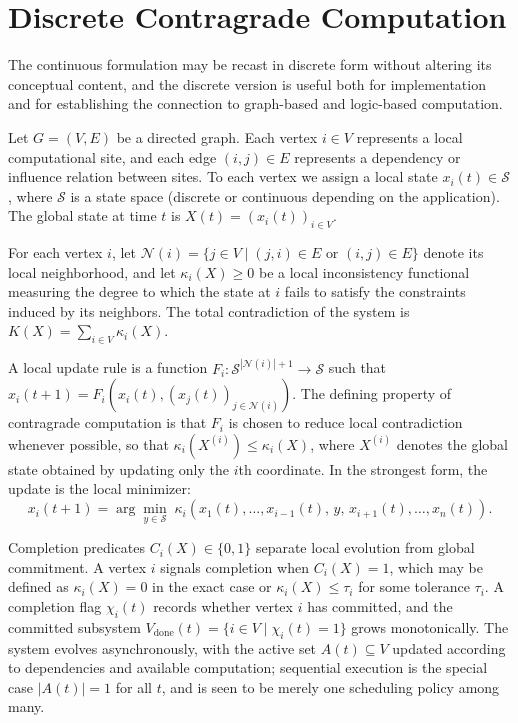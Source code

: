 \documentclass[12pt,a4paper,openany]{book}
\theoremstyle{plain}
\theoremstyle{definition}
\theoremstyle{remark}
\begin{document}
\section{Discrete Contragrade Computation}

The continuous formulation may be recast in discrete form without altering its conceptual content, and the discrete version is useful both for implementation and for establishing the connection to graph-based and logic-based computation.

Let $G = (V, E)$ be a directed graph. Each vertex $i \in V$ represents a local computational site, and each edge $(i, j) \in E$ represents a dependency or influence relation between sites. To each vertex we assign a local state $x_i(t) \in \mathcal{S}$, where $\mathcal{S}$ is a state space (discrete or continuous depending on the application). The global state at time $t$ is $X(t) = (x_i(t))_{i \in V}$.

For each vertex $i$, let $\mathcal{N}(i) = \{j \in V \mid (j, i) \in E \text{ or } (i, j) \in E\}$ denote its local neighborhood, and let $\kappa_i(X) \geq 0$ be a local inconsistency functional measuring the degree to which the state at $i$ fails to satisfy the constraints induced by its neighbors. The total contradiction of the system is $K(X) = \sum_{i \in V} \kappa_i(X)$.

A local update rule is a function $F_i : \mathcal{S}^{|\mathcal{N}(i)|+1} \to \mathcal{S}$ such that $x_i(t+1) = F_i(x_i(t), (x_j(t))_{j \in \mathcal{N}(i)})$. The defining property of contragrade computation is that $F_i$ is chosen to reduce local contradiction whenever possible, so that $\kappa_i(X^{(i)}) \leq \kappa_i(X)$, where $X^{(i)}$ denotes the global state obtained by updating only the $i$th coordinate. In the strongest form, the update is the local minimizer:
\[
x_i(t+1) = \arg\min_{y \in \mathcal{S}}\; \kappa_i(x_1(t), \ldots, x_{i-1}(t),\, y,\, x_{i+1}(t), \ldots, x_n(t)).
\]

Completion predicates $C_i(X) \in \{0, 1\}$ separate local evolution from global commitment. A vertex $i$ signals completion when $C_i(X) = 1$, which may be defined as $\kappa_i(X) = 0$ in the exact case or $\kappa_i(X) \leq \tau_i$ for some tolerance $\tau_i$. A completion flag $\chi_i(t)$ records whether vertex $i$ has committed, and the committed subsystem $V_{\mathrm{done}}(t) = \{i \in V \mid \chi_i(t) = 1\}$ grows monotonically. The system evolves asynchronously, with the active set $A(t) \subseteq V$ updated according to dependencies and available computation; sequential execution is the special case $|A(t)| = 1$ for all $t$, and is seen to be merely one scheduling policy among many.
\end{document}
